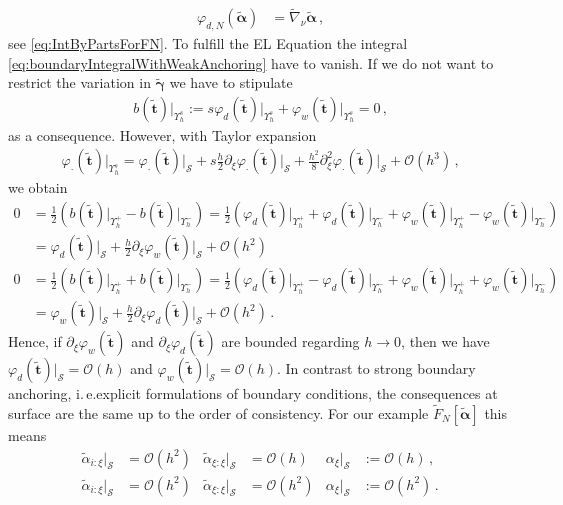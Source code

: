 \documentclass[a4paper,10pt]{scrartcl}
\newcommand{\surf}{\mathcal{S}}
\newcommand{\landau}{\mathcal{O}}
\newcommand{\tb}{\mathbf{t}}
\newcommand{\alphab}{\bm{\alpha}}
\newcommand{\gammab}{\bm{\gamma}}
\newcommand{\ttb}{\tilde{\tb}}
\newcommand{\talphab}{\tilde{\alphab}}
\newcommand{\talpha}{\tilde{\alpha}}
\newcommand{\tgammab}{\tilde{\gammab}}
\newcommand{\tnabla}{\tilde{\nabla}}
\newcommand{\boundary}[1]{\Upsilon_{h}^{#1}}
\newcommand{\AtBoundary}[1]{\big|_{\boundary{#1}}}
\newcommand{\AtSurface}{\big|_{\surf}}
\newcommand{\formComma}{\,\text{,}}
\newcommand{\formPeriod}{\,\text{.}}
\newcommand{\ie}{i.\,e.}%
\begin{document}
    \begin{align}
      \varphi_{d,N}(\talphab) &= \tnabla_{\nu}\talphab \formComma
    \end{align}
    see \eqref{eq:IntByPartsForFN}.
    To fulfill the EL Equation the integral \eqref{eq:boundaryIntegralWithWeakAnchoring} have to vanish.
    If we do not want to restrict the variation in \( \tgammab \) we have to stipulate
    \begin{align}
      b(\ttb)\AtBoundary{s} := s\varphi_{d}(\ttb)\AtBoundary{s} + \varphi_{w}(\ttb)\AtBoundary{s} = 0 \formComma
    \end{align}
    as a consequence.
    However, with Taylor expansion
    \begin{align}
      \varphi_{\cdot}(\ttb)\AtBoundary{s} =  \varphi_{\cdot}(\ttb)\AtSurface 
                                            + s \frac{h}{2}\partial_{\xi} \varphi_{\cdot}(\ttb)\AtSurface
                                            + \frac{h^{2}}{8} \partial_{\xi}^{2} \varphi_{\cdot}(\ttb)\AtSurface + \landau(h^{3}) \formComma
    \end{align}
    we obtain
    \begin{align}
      0 &= \frac{1}{2}\left( b(\ttb)\AtBoundary{+} - b(\ttb)\AtBoundary{-} \right)
         = \frac{1}{2}\left( \varphi_{d}(\ttb)\AtBoundary{+} +  \varphi_{d}(\ttb)\AtBoundary{-} + \varphi_{w}(\ttb)\AtBoundary{+} -  \varphi_{w}(\ttb)\AtBoundary{-}\right)\\
        &= \varphi_{d}(\ttb)\AtSurface + \frac{h}{2} \partial_{\xi}\varphi_{w}(\ttb)\AtSurface + \landau(h^{2}) \label{eq:weakanchoringconsequenceminus}\\
      0 &= \frac{1}{2}\left( b(\ttb)\AtBoundary{+} + b(\ttb)\AtBoundary{-} \right)
         = \frac{1}{2}\left( \varphi_{d}(\ttb)\AtBoundary{+} -  \varphi_{d}(\ttb)\AtBoundary{-} + \varphi_{w}(\ttb)\AtBoundary{+} +  \varphi_{w}(\ttb)\AtBoundary{-}\right)\\
        &= \varphi_{w}(\ttb)\AtSurface + \frac{h}{2} \partial_{\xi}\varphi_{d}(\ttb)\AtSurface + \landau(h^{2}) \formPeriod \label{eq:weakanchoringconsequenceplus}
    \end{align}
    Hence, if \( \partial_{\xi}\varphi_{w}(\ttb) \) and \( \partial_{\xi}\varphi_{d}(\ttb) \) are bounded regarding \( h \rightarrow 0 \),
    then we have \( \varphi_{d}(\ttb)\AtSurface = \landau(h) \) and \( \varphi_{w}(\ttb)\AtSurface = \landau(h) \).
    In contrast to strong boundary anchoring, \ie explicit formulations of boundary conditions, the consequences at surface are the same up to the order of consistency. 
    For our example \( \tilde{F}_{N}[\talphab] \) this means
    \begin{align}
      \talpha_{i:\xi}\AtSurface &=  \landau(h^{2})
      &\talpha_{\xi:\xi}\AtSurface &= \landau(h)
      &\alpha_{\xi}\AtSurface &:= \landau(h) \tag{WNPNC} \formComma\\
      \talpha_{i:\xi}\AtSurface &=  \landau(h^{2})
      &\talpha_{\xi:\xi}\AtSurface &= \landau(h^{2})
      &\alpha_{\xi}\AtSurface &:= \landau(h^{2}) \tag{NPNC} \formPeriod
    \end{align}
\end{document}
